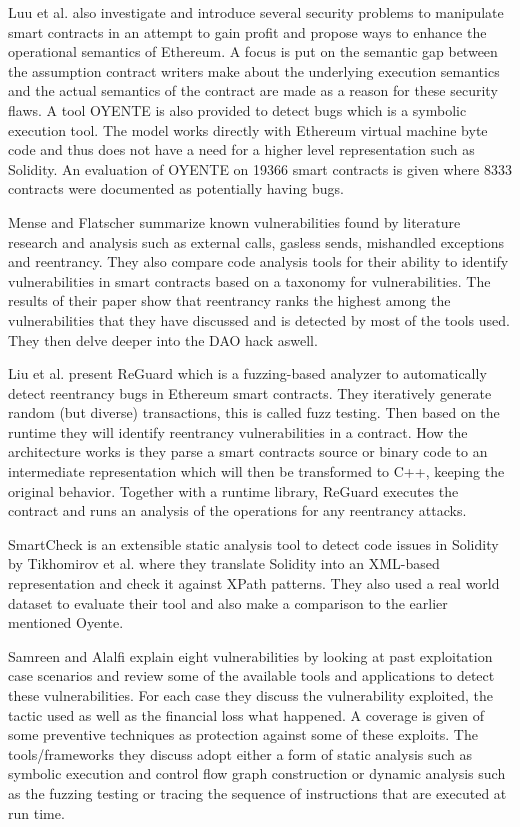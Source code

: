 \documentclass[10pt,conference]{IEEEtran}
\begin{document}
Luu et al.  \cite{smarter} also investigate and introduce several security problems to manipulate smart contracts in an attempt to gain profit and propose ways to enhance the operational semantics of Ethereum. A focus is put on the semantic gap between the assumption contract writers make about the underlying execution semantics and the actual semantics of the contract are made as a reason for these security flaws. A tool OYENTE is also provided to detect bugs which is a symbolic execution tool. The model works directly with Ethereum virtual machine byte code and thus does not have a need for a higher level representation such as Solidity. An evaluation of OYENTE on 19366 smart contracts is given where 8333 contracts were documented as potentially having bugs.

Mense and Flatscher \cite{security} summarize known vulnerabilities found by literature research and analysis such as external calls, gasless sends, mishandled exceptions and reentrancy. They also compare code analysis tools for their ability to identify vulnerabilities in smart contracts based on a taxonomy for vulnerabilities. The results of their paper show that reentrancy ranks the highest among the vulnerabilities that they have discussed and is detected by most of the tools used. They then delve deeper into the DAO hack aswell. 


Liu et al. \cite{reguard} present ReGuard which is a fuzzing-based analyzer to automatically detect reentrancy bugs in Ethereum smart contracts. They iteratively generate random (but diverse) transactions, this is called fuzz testing. Then based on the runtime they will identify reentrancy vulnerabilities in a contract. How the architecture works is they parse a smart contracts source or binary code to an intermediate representation which will then be transformed to C++, keeping the original behavior. Together with a runtime library, ReGuard executes the contract and runs an analysis of the operations for any reentrancy attacks.


SmartCheck is an extensible static analysis tool to detect code issues in Solidity by Tikhomirov et al.\cite{smartcheck} where they translate Solidity into an XML-based representation and check it against XPath patterns. They also used a real world dataset to evaluate their tool and also make a comparison to the earlier mentioned Oyente. 


Samreen and Alalfi  \cite{survey} explain eight vulnerabilities by looking at past exploitation case scenarios and review some of the available tools and applications to detect these vulnerabilities. For each case they discuss the vulnerability exploited, the tactic used as well as the financial loss what happened. A coverage is given of some preventive techniques as protection against some of these exploits. The tools/frameworks they discuss adopt either a form of static analysis such as symbolic execution and control flow graph construction or dynamic analysis such as the fuzzing testing or tracing the sequence of instructions that are executed at run time. 
\end{document}
